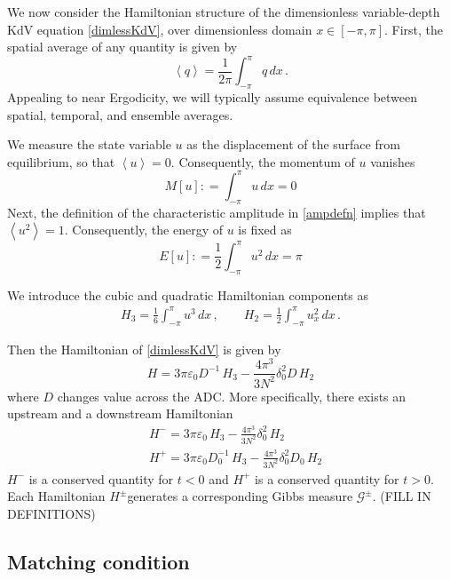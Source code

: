 \documentclass[11pt]{article}
\newcommand{\vsp}[1]{\vspace{#1 pc} \noindent}
\newcommand{\mean}[1]{\left< #1 \right>}
\newcommand{\eps}{\varepsilon}
\newcommand{\defeq}{\mathrel{\mathop:}=}
\newcommand{\lamfac}{N}
\newcommand{\epsup}{\eps_0}
\newcommand{\delup}{\delta_0}
\newcommand{\drat}{D}
\newcommand{\dratdn}{\drat_0}
\newcommand{\Ham}{H}
\newcommand{\Hup}{\Ham^{-}}
\newcommand{\Hdn}{\Ham^{+}}
\newcommand{\Gibbs}{\mathcal{G}}
\newcommand{\dx}{\, dx}
\begin{document}
We now consider the Hamiltonian structure of the dimensionless variable-depth KdV equation \eqref{dimlessKdV}, over dimensionless domain $x \in [-\pi,\pi]$. First, the spatial average of any quantity is given by
\begin{equation}
\mean{q} = \frac{1}{2\pi} \int_{-\pi}^{\pi} q \dx \, .
\end{equation}
Appealing to near Ergodicity, we will typically assume equivalence between spatial, temporal, and ensemble averages. 

We measure the state variable $u$ as the displacement of the surface from equilibrium, so that $\mean{u} = 0$. Consequently, the momentum of $u$ vanishes
\begin{equation}
M[u] \defeq \int_{-\pi}^{\pi} u \dx = 0
\end{equation}
Next, the definition of the characteristic amplitude in \eqref{ampdefn} implies that $\mean{u^2} = 1$. Consequently, the energy of $u$ is fixed as
\begin{equation}
E[u] \defeq \frac{1}{2} \int_{-\pi}^{\pi} u^2 \dx = \pi
\end{equation}


We introduce the cubic and quadratic Hamiltonian components as
\begin{align}
H_3 = \frac{1}{6} \int_{-\pi}^{\pi} u^3 \dx	\, , \qquad
H_2 = \frac{1}{2} \int_{-\pi}^{\pi} u_x^2 \dx	\, .
\end{align}

Then the Hamiltonian of \eqref{dimlessKdV} is given by
\begin{equation}
\Ham = 3 \pi \epsup \drat^{-1} \, H_3 - \frac{4 \pi^3}{3 \lamfac^2} \delup^2 \drat \, H_2
\end{equation}
where $\drat$ changes value across the ADC. More specifically, there exists an upstream and a downstream Hamiltonian
\begin{align}
&\Hup = 3 \pi \epsup \, H_3 - \frac{4 \pi^3}{3 \lamfac^2} \delup^2 \, H_2 \\
&\Hdn = 3 \pi \epsup \dratdn^{-1} \, H_3 - \frac{4 \pi^3}{3 \lamfac^2} \delup^2 \dratdn \, H_2
\end{align}
$\Hup$ is a conserved quantity for $t<0$ and $\Hdn$ is a conserved quantity for $t>0$. Each Hamiltonian $\Ham^{\pm}$generates a corresponding Gibbs measure $\Gibbs^{\pm}$. (FILL IN DEFINITIONS)






\vsp{10} 
\subsection{Matching condition}
\end{document}

